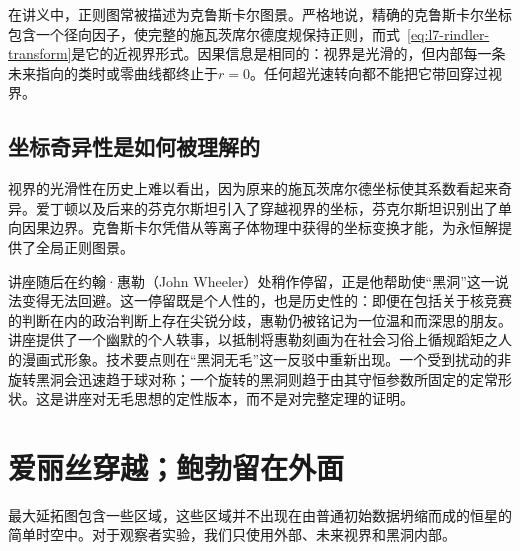 \begin{classroomqa}
\end{classroomqa}

\begin{classroomqa}
\end{classroomqa}

在讲义中，正则图常被描述为克鲁斯卡尔图景。严格地说，精确的克鲁斯卡尔坐标包含一个径向因子，使完整的施瓦茨席尔德度规保持正则，而式~\eqref{eq:l7-rindler-transform}是它的近视界形式。因果信息是相同的：视界是光滑的，但内部每一条未来指向的类时或零曲线都终止于\(r=0\)。任何超光速转向都不能把它带回穿过视界。

\subsection{坐标奇异性是如何被理解的}

视界的光滑性在历史上难以看出，因为原来的施瓦茨席尔德坐标使其系数看起来奇异。爱丁顿以及后来的芬克尔斯坦引入了穿越视界的坐标，芬克尔斯坦识别出了单向因果边界。克鲁斯卡尔凭借从等离子体物理中获得的坐标变换才能，为永恒解提供了全局正则图景。

讲座随后在约翰·惠勒（John Wheeler）处稍作停留，正是他帮助使“黑洞”这一说法变得无法回避。这一停留既是个人性的，也是历史性的：即便在包括关于核竞赛的判断在内的政治判断上存在尖锐分歧，惠勒仍被铭记为一位温和而深思的朋友。讲座提供了一个幽默的个人轶事，以抵制将惠勒刻画为在社会习俗上循规蹈矩之人的漫画式形象。技术要点则在“黑洞无毛”这一反驳中重新出现。一个受到扰动的非旋转黑洞会迅速趋于球对称；一个旋转的黑洞则趋于由其守恒参数所固定的定常形状。这是讲座对无毛思想的定性版本，而不是对完整定理的证明。

\section{爱丽丝穿越；鲍勃留在外面}

最大延拓图包含一些区域，这些区域并不出现在由普通初始数据坍缩而成的恒星的简单时空中。对于观察者实验，我们只使用外部、未来视界和黑洞内部。

